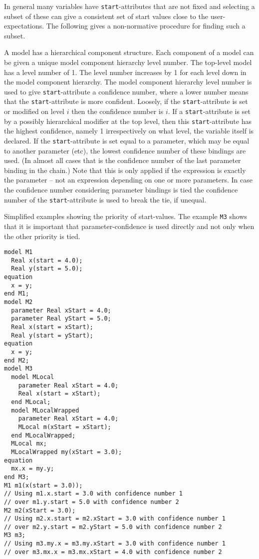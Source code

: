 In general many variables have \lstinline!start!-attributes that are not fixed and selecting a subset of these can give a consistent set of start values close to the user-expectations.
The following gives a non-normative procedure for finding such a subset.

\begin{nonnormative}
A model has a hierarchical component structure.
Each component of a model can be given a unique model component hierarchy level number.
The top-level model has a level number of 1.
The level number increases by 1 for each level down in the model component hierarchy.
The model component hierarchy level number is used to give \lstinline!start!-attribute a confidence number, where a lower number means that the \lstinline!start!-attribute is more confident.
Loosely, if the \lstinline!start!-attribute is set or modified on level $i$ then the confidence number is $i$.
If a \lstinline!start!-attribute is set by a possibly hierarchical modifier at the top level, then this \lstinline!start!-attribute has the highest confidence, namely 1 irrespectively on what level, the variable itself is declared.
If the \lstinline!start!-attribute is set equal to a parameter, which may be equal to another parameter (etc), the lowest confidence number of these bindings are used.
(In almost all cases that is the confidence number of the last parameter binding in the chain.)
Note that this is only applied if the expression is exactly the parameter -- not an expression depending on one or more parameters.
In case the confidence number considering parameter bindings is tied the confidence number of the \lstinline!start!-attribute is used to break the tie, if unequal.
\begin{example}
Simplified examples showing the priority of start-values.
The example \lstinline!M3! shows that it is important that parameter-confidence is used directly and not only when the other priority is tied.
\begin{lstlisting}[language=modelica]
model M1
  Real x(start = 4.0);
  Real y(start = 5.0);
equation
  x = y;
end M1;
model M2
  parameter Real xStart = 4.0;
  parameter Real yStart = 5.0;
  Real x(start = xStart);
  Real y(start = yStart);
equation
  x = y;
end M2;
model M3
  model MLocal
    parameter Real xStart = 4.0;
    Real x(start = xStart);
  end MLocal;
  model MLocalWrapped
    parameter Real xStart = 4.0;
    MLocal m(xStart = xStart);
  end MLocalWrapped;
  MLocal mx;
  MLocalWrapped my(xStart = 3.0);
equation
  mx.x = my.y;
end M3;
M1 m1(x(start = 3.0));
// Using m1.x.start = 3.0 with confidence number 1
// over m1.y.start = 5.0 with confidence number 2
M2 m2(xStart = 3.0);
// Using m2.x.start = m2.xStart = 3.0 with confidence number 1
// over m2.y.start = m2.yStart = 5.0 with confidence number 2
M3 m3;
// Using m3.my.x = m3.my.xStart = 3.0 with confidence number 1
// over m3.mx.x = m3.mx.xStart = 4.0 with confidence number 2
\end{lstlisting}
\end{example}
\end{nonnormative}
